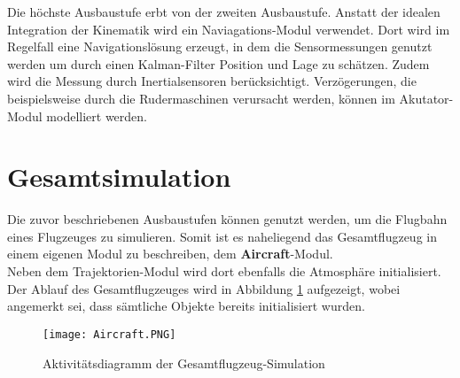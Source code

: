 Die höchste Ausbaustufe erbt von der zweiten Ausbaustufe. Anstatt der idealen Integration der Kinematik wird ein Naviagations-Modul verwendet. Dort wird im Regelfall eine Navigationslösung erzeugt, in dem die Sensormessungen genutzt werden um durch einen Kalman-Filter Position und Lage zu schätzen. Zudem wird die Messung durch Inertialsensoren berücksichtigt. Verzögerungen, die beispielsweise durch die Rudermaschinen verursacht werden, können im Akutator-Modul modelliert werden.

\section{Gesamtsimulation}
Die zuvor beschriebenen Ausbaustufen können genutzt werden, um die Flugbahn eines Flugzeuges zu simulieren. Somit ist es naheliegend das Gesamtflugzeug in einem eigenen Modul zu beschreiben, dem \textbf{Aircraft}-Modul.\\
Neben dem Trajektorien-Modul wird dort ebenfalls die Atmosphäre initialisiert. Der Ablauf des Gesamtflugzeuges wird in Abbildung \ref{fig:Aircraft} aufgezeigt, wobei angemerkt sei, dass sämtliche Objekte bereits initialisiert wurden.
\begin{figure}[h]
	\texttt{[image: Aircraft.PNG]}
	\label{fig:Aircraft}
	\caption{Aktivitätsdiagramm der Gesamtflugzeug-Simulation}
\end{figure}\\
